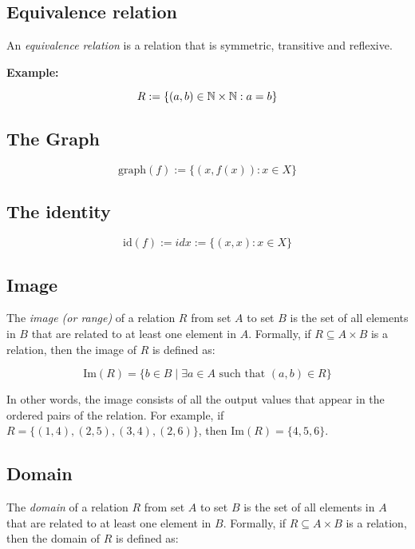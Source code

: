 \subsection{Equivalence relation}

An \emph{equivalence relation} is a relation that is symmetric, transitive and reflexive.
\vspace{\baselineskip}

\textbf{Example:}
\vspace{\baselineskip}

\[
	R:= \{ (a,b) \in \mathbb{N} \times \mathbb{N}: a = b\}
\]

\subsection{The Graph}

\[
	\text{graph}(f):= \{(x, f(x)): x \in X\}
\]

\subsection{The identity}

\[
	\text{id}(f):= idx:= \{(x, x): x \in X\}
\]

\subsection{Image}

The \emph{image (or range)} of a relation \(R\) from set \(A\) to set \(B\) is the set of all elements in \(B\) that are related to at least one element in \(A\). Formally, if \(R \subseteq A \times B\) is a relation, then the image of \(R\) is defined as:

\[
	\text{Im}(R) = \{b \in B \mid \exists a \in A \text{ such that } (a,b) \in R\}
\]

In other words, the image consists of all the output values that appear in the ordered pairs of the relation. For example, if \(R = \{(1,4), (2,5), (3,4), (2,6)\}\), then \(\text{Im}(R) = \{4, 5, 6\}\).

\subsection{Domain}

The \emph{domain} of a relation \(R\) from set \(A\) to set \(B\) is the set of all elements in \(A\) that are related to at least one element in \(B\). Formally, if \(R \subseteq A \times B\) is a relation, then the domain of \(R\) is defined as:

